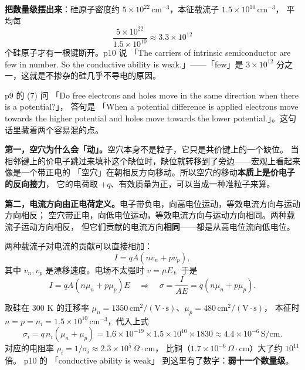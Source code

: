 \documentclass[11pt]{ctexart}
\begin{document}
\textbf{把数量级摆出来}：硅原子密度约 $5\times10^{22}\,\mathrm{cm^{-3}}$，本征载流子 $1.5\times10^{10}\,\mathrm{cm^{-3}}$，
平均每
\[
\frac{5\times10^{22}}{1.5\times10^{10}}\approx3.3\times10^{12}
\]
个硅原子才有一根键断开。p10 说 「The carriers of intrinsic semiconductor are few in number.
So the conductive ability is weak.」——「few」是 $3\times10^{12}$ 分之一，这就是不掺杂的硅几乎不导电的原因。


p9 的 (7) 问 「Do free electrons and holes move in the same direction when there is a potential?」，
答句是 「When a potential difference is applied electrons move towards the higher potential and
holes move towards the lower potential.」。这句话里藏着两个容易混的点。

\textbf{第一，空穴为什么会「动」。}空穴本身不是粒子，它只是共价键上的一个缺位。
当相邻键上的价电子跳过来填补这个缺位时，缺位就转移到了旁边——宏观上看起来像是一个带正电的
「空穴」在朝相反方向移动。所以空穴的移动\textbf{本质上是价电子的反向接力}，
它的电荷取 $+q$、有效质量为正，可以当成一种准粒子来算。

\textbf{第二，电流方向由正电荷定义。}电子带负电，向高电位运动，等效电流方向与运动方向相反；
空穴带正电，向低电位运动，等效电流方向与运动方向相同。两种载流子运动方向相反，
但它们贡献的电流方向\textbf{相同}——都是从高电位流向低电位。


两种载流子对电流的贡献可以直接相加：
\[
I=qA\left(n v_n+p v_p\right),
\]
其中 $v_n,v_p$ 是漂移速度。电场不太强时 $v=\mu E$，于是
\[
I=qA\left(n\mu_n+p\mu_p\right)E
\quad\Longrightarrow\quad
\sigma=\frac{I}{AE}=q\left(n\mu_n+p\mu_p\right).
\]


取硅在 300 K 的迁移率 $\mu_n=1350\,\mathrm{cm^2/(V\cdot s)}$、$\mu_p=480\,\mathrm{cm^2/(V\cdot s)}$，
本征时 $n=p=n_i=1.5\times10^{10}\,\mathrm{cm^{-3}}$，代入上式
\[
\sigma_i=q\,n_i\left(\mu_n+\mu_p\right)
=1.6\times10^{-19}\times1.5\times10^{10}\times1830
\approx4.4\times10^{-6}\,\mathrm{S/cm}.
\]
对应的电阻率 $\rho_i=1/\sigma_i\approx2.3\times10^{5}\,\Omega\cdot\mathrm{cm}$，
比铜（$1.7\times10^{-6}\,\Omega\cdot\mathrm{cm}$）大了约 $10^{11}$ 倍。
p10 的 「conductive ability is weak」 到这里有了数字：\textbf{弱十一个数量级}。
\end{document}
